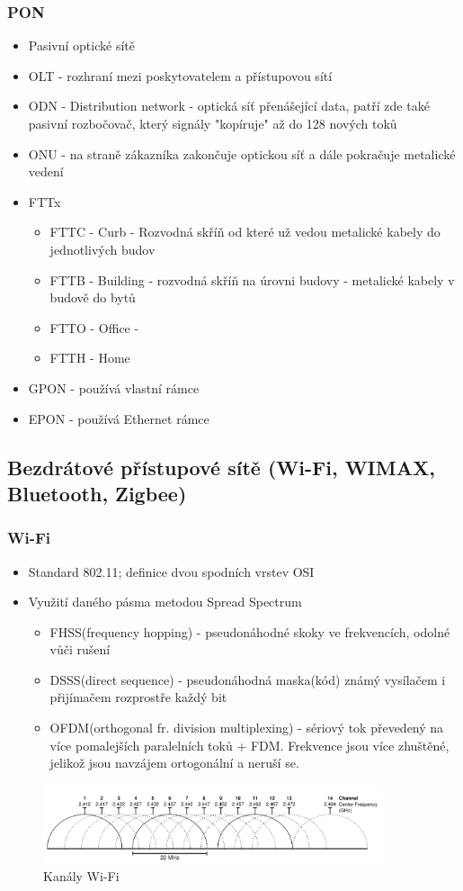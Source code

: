 \documentclass[10pt,a4paper]{article}
\begin{document}
\subsubsection{PON}
\begin{itemize}
\item Pasivní optické sítě
\item OLT - rozhraní mezi poskytovatelem a přístupovou sítí
\item ODN - Distribution network - optická síť přenášející data, patří zde také pasivní rozbočovač, který signály "kopíruje" až do 128 nových toků
\item ONU - na straně zákazníka zakončuje optickou síť a dále pokračuje metalické vedení
\item FTTx
\begin{itemize}
\item FTTC - Curb - Rozvodná skříň od které už vedou metalické kabely do jednotlivých budov
\item FTTB - Building - rozvodná skříň na úrovni budovy - metalické kabely v budově do bytů
\item FTTO - Office -
\item FTTH - Home
\end{itemize}
\item GPON - používá vlastní rámce
\item EPON - používá Ethernet rámce
\end{itemize}

\subsection{Bezdrátové přístupové sítě (Wi-Fi, WIMAX, Bluetooth, Zigbee)}
\subsubsection{Wi-Fi}

\begin{itemize}
\item Standard 802.11; definice dvou spodních vrstev OSI
\item Využití daného pásma metodou Spread Spectrum
\begin{itemize}
\item FHSS(frequency hopping) - pseudonáhodné skoky ve frekvencích, odolné vůči rušení
\item DSSS(direct sequence) - pseudonáhodná maska(kód) známý vysílačem i přijímačem rozprostře každý bit
\item OFDM(orthogonal fr. division multiplexing) - sériový tok převedený na více pomalejších paralelních toků + FDM. Frekvence jsou více zhuštěné, jelikož jsou navzájem ortogonální a neruší se.
\end{itemize}
\end{itemize}
\begin{figure}[ht]
    \centering
    \includegraphics[width=10cm]{wifiChannels.png}
    \caption{Kanály Wi-Fi}
    \label{fig:Wi-FiChannels}
\end{figure}
\end{document}
